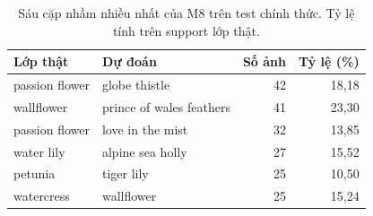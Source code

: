 \begin{table}[H]\centering\small
\caption{Sáu cặp nhầm nhiều nhất của M8 trên test chính thức. Tỷ lệ tính trên support lớp thật.}
\begin{tabular}{llrr}\toprule
Lớp thật & Dự đoán & Số ảnh & Tỷ lệ (\%)\\\midrule
passion flower & globe thistle & 42 & 18,18\\
wallflower & prince of wales feathers & 41 & 23,30\\
passion flower & love in the mist & 32 & 13,85\\
water lily & alpine sea holly & 27 & 15,52\\
petunia & tiger lily & 25 & 10,50\\
watercress & wallflower & 25 & 15,24\\
\bottomrule\end{tabular}
\end{table}
